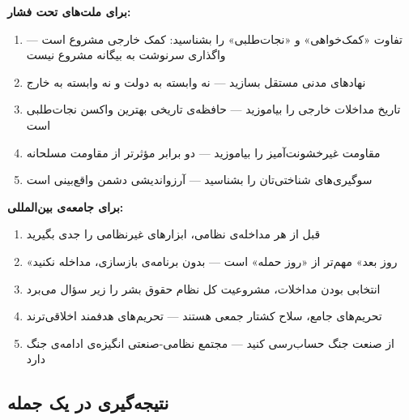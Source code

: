 \begin{tcolorbox}[successbox, title={توصیه‌ها برای سیاست‌گذاران و فعالان مدنی}]
\textbf{برای ملت‌های تحت فشار:}
\begin{enumerate}
\item تفاوت «کمک‌خواهی» و «نجات‌طلبی» را بشناسید: کمک خارجی مشروع است — واگذاری سرنوشت به بیگانه مشروع نیست
\item نهادهای مدنی مستقل بسازید — نه وابسته به دولت و نه وابسته به خارج
\item تاریخ مداخلات خارجی را بیاموزید — حافظه‌ی تاریخی بهترین واکسن نجات‌طلبی است
\item مقاومت غیرخشونت‌آمیز را بیاموزید — دو برابر مؤثرتر از مقاومت مسلحانه
\item سوگیری‌های شناختی‌تان را بشناسید — آرزواندیشی دشمن واقع‌بینی است
\end{enumerate}

\textbf{برای جامعه‌ی بین‌المللی:}
\begin{enumerate}
\item قبل از هر مداخله‌ی نظامی، ابزارهای غیرنظامی را جدی بگیرید
\item «روز بعد» مهم‌تر از «روز حمله» است — بدون برنامه‌ی بازسازی، مداخله نکنید
\item انتخابی بودن مداخلات، مشروعیت کل نظام حقوق بشر را زیر سؤال می‌برد
\item تحریم‌های جامع، سلاح کشتار جمعی هستند — تحریم‌های هدفمند اخلاقی‌ترند
\item از صنعت جنگ حساب‌رسی کنید — مجتمع نظامی-صنعتی انگیزه‌ی ادامه‌ی جنگ دارد
\end{enumerate}
\end{tcolorbox}

\subsection{نتیجه‌گیری در یک جمله}

\begin{center}
\large\textbf{}\\[6pt]
\large\textbf{}
\end{center}

\cleardoublepage